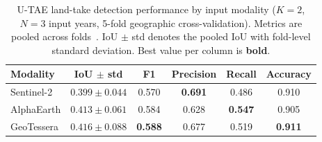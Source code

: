 

\begin{table}[ht]
  \centering
  \caption{%
    U-TAE land-take detection performance by input modality
    ($K = 2$, $N = 3$ input years, 5-fold geographic cross-validation).
    Metrics are pooled across folds~\citep{garnot2021pastis}.
    IoU $\pm$ std denotes the pooled IoU with fold-level standard deviation.
    Best value per column is \textbf{bold}.%
  }
  \label{tab:modality_comparison}
  \begin{tabular}{lccccc}
    \toprule
    Modality   & IoU $\pm$ std & F1 & Precision & Recall & Accuracy \\
    \midrule
    Sentinel-2  & $0.399 \pm 0.044$ & 0.570           & \textbf{0.691} & 0.486           & 0.910           \\
    AlphaEarth  & $0.413 \pm 0.061$ & 0.584           & 0.628           & \textbf{0.547} & 0.905           \\
    GeoTessera  & $\mathbf{0.416} \pm 0.088$ & \textbf{0.588} & 0.677           & 0.519           & \textbf{0.911} \\
    \bottomrule
  \end{tabular}
\end{table}

